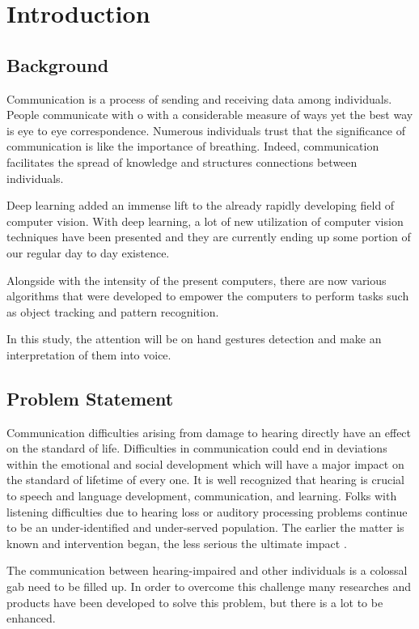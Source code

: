 \documentclass[12pt]{report}
\begin{document}
\setcounter{page}{2}                    
\tableofcontents{}
\listoffigures
\listoftables
\newpage

\chapter{Introduction} 

\section{Background}
Communication is a process of sending and receiving data among individuals. 
People communicate with o with a considerable measure of ways yet the best way is eye to eye correspondence.
Numerous individuals trust that the significance of communication 
is like the importance of breathing. Indeed, communication facilitates the spread of knowledge
and structures connections between individuals.

Deep learning added an immense lift to the already rapidly developing field of computer vision.
With deep learning, a lot of new utilization of computer vision techniques have been presented
and they are currently ending up some portion of our regular day to day existence.

Alongside with the intensity of the present computers, there are now various algorithms that were developed 
to empower the computers to perform tasks such as object tracking and pattern recognition. 

In this study, the attention will be on hand gestures detection and make an interpretation of them into voice.

\section{Problem Statement}
Communication difficulties arising from damage to hearing
directly have an effect on the standard of life. Difficulties in communication could
end in deviations within the emotional and social development which
will have a major impact on the standard of lifetime of every one.
It is well recognized that hearing is crucial to speech and language development, communication, and learning.
Folks with listening difficulties due to hearing loss or auditory processing problems
continue to be an under-identified and under-served population. The
earlier the matter is known and intervention began, the less
serious the ultimate impact \cite{AFrajtag12017}.

The communication between hearing-impaired and other individuals is a colossal gab 
need to be filled up. In order to overcome this challenge 
many researches and products have been developed to solve this problem, 
but there is a lot to be enhanced.
\end{document}
